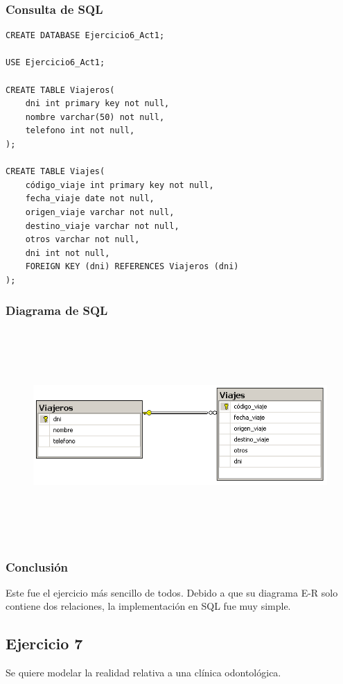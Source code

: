 \documentclass[a4paper, 12pt]{article}
\begin{document}
\begin{justify}
        \subsubsection{Consulta de SQL}
\begin{verbatim}
CREATE DATABASE Ejercicio6_Act1;

USE Ejercicio6_Act1;

CREATE TABLE Viajeros(
    dni int primary key not null,
    nombre varchar(50) not null,
    telefono int not null,
);

CREATE TABLE Viajes(
    código_viaje int primary key not null,
    fecha_viaje date not null,
    origen_viaje varchar not null,
    destino_viaje varchar not null,
    otros varchar not null,
    dni int not null,
    FOREIGN KEY (dni) REFERENCES Viajeros (dni)
);
\end{verbatim}
        \subsubsection{Diagrama de SQL}
        \begin{figure}[H]
            \centering
            \includegraphics[width=12cm,height=8cm]{sql6.PNG}
        \end{figure}
        \subsubsection{Conclusión}
        \justify
        Este fue el ejercicio más sencillo de todos. Debido a que su diagrama E-R solo contiene dos relaciones, la implementación en SQL fue muy simple.
        \subsection{Ejercicio 7}
        \justify
        Se quiere modelar la realidad relativa a una clínica odontológica.

\end{justify}
\end{document}
